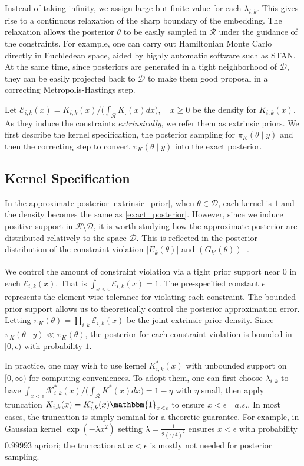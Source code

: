\documentclass[10pt]{article}
\newcommand{\mc}[1]{\mathcal{#1}}
\begin{document}
Instead of taking infinity, we assign large but finite value for each $\lambda_{i,k}$. This gives rise to a continuous relaxation of the sharp boundary of the embedding. The relaxation allows the posterior $\theta$ to be easily sampled in $\mc R$ under the guidance of the constraints. For example, one can carry out Hamiltonian Monte Carlo directly in Euchledean space, aided by highly automatic software such as STAN. At the same time, since posteriors are generated in a tight neighborhood of $\mc D$, they can be easily projected back to $\mc D$ to make them good proposal in a correcting Metropolis-Hastings step.


Let $\mc E_{i,k}(x)=K_{i,k}(x) / \big( \int_{\mc R} K_{.}(x) dx\big ),\quad x\ge 0$ be the density for $K_{i,k}(x)$. As they induce the constraints {\it extrinsically}, we refer them as extrinsic priors. We first describe the kernel specification, the posterior sampling for $\pi_{K}(\theta \mid y)$ and then the correcting step to convert $\pi_{K}(\theta \mid y)$ into the exact posterior.

\subsection{Kernel Specification}

In the approximate posterior \eqref{extrinsic_prior}, when $\theta \in \mc D$, each kernel is $1$ and the density becomes the same as \eqref{exact_posterior}. However, since we induce positive support in $\mc R \setminus \mc D$, it is worth studying how the approximate posterior are distributed relatively to the space $\mc D$. This is reflected in the posterior distribution of the constraint violation $|E_k(\theta)|$ and $(G_{k'}(\theta))_+$.

We control the amount of constraint violation via a tight prior support near $0$ in each $\mc E_{i,k}(x)$. That is $\int_{x<\epsilon} \mc E_{i,k}(x) = 1$. The pre-specified constant $\epsilon$ represents the element-wise tolerance for violating each constraint. The bounded prior support allows us to theoretically control the posterior approximation error. Letting $\pi_K(\theta) =\prod_{i,k} \mc E_{i,k}(x)$ be the joint extrinsic prior density. Since $\pi_K(\theta \mid y) \ll \pi_K(\theta)$, the posterior for each constraint violation is bounded in $[0,\epsilon)$ with probability $1$.

In practice, one may wish to use kernel $K^*_{i,k}(x)$ with unbounded support on $[0,\infty)$ for computing conveniences. To adopt them, one can first choose $\lambda_{i,k}$ to have $\int_{x<\epsilon} \mc K^*_{i,k}(x)/ \big( \int_{\mc R} K^*_{.}(x) dx\big ) = 1-\eta$ with $\eta$ small, then apply truncation $K_{i,k}(x)= K^*_{i,k}(x) \mathbbm{1}_{x<\epsilon}$ to ensure $x<\epsilon \quad a.s.$. In most cases, the truncation is simply nominal for a theoretic guarantee. For example, in Gaussian kernel $\exp( -{\lambda x^2})$ setting $\lambda = \frac{1}{ 2(\epsilon/4)^2}$ ensures $x<\epsilon$ with probability $0.99993$ apriori; the truncation at $x<\epsilon$ is mostly not needed for posterior sampling.
\end{document}
